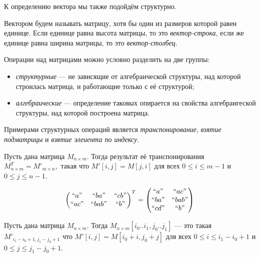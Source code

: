 К определению вектора мы также подойдём структурно.

\begin{definition}[Вектор]

Вектором будем называть матрицу, хотя бы один из размеров которой равен единице. Если единице равна высота матрицы, то это \textit{вектор-строка}, если же единице равна ширина матрицы, то это \textit{вектор-столбец}.

\end{definition}


Операции над матрицами можно условно разделить на две группы:
\begin{itemize}
	\item \textit{структурные} --- не зависящие от алгебраической структуры, над которой строилась матрица, и работающие только с её структурой;
	\item \textit{алгебраические} --- определение таковых опирается на свойства алгебраигеской структуры, над которой построена матрица.
\end{itemize}

Примерами структурных операций является \textit{транспонирование}, \textit{взятие подматрицы} и \textit{взятие элеиента по индексу}.

\begin{definition}
Пусть дана матрица $M_{n\times m}$. Тогда результат её транспонирования 
$
M_{n\times m}^T = M'_{m\times n},
$
такая что $M'[i,j] = M[j,i]$ для всех $0\leq i \leq m - 1$ и $0\leq j \leq n - 1$.
\end{definition}

\begin{example}
$$
\begin{pmatrix}
``a"  & ``ba"  & ``cb" \\
``ac" & ``bab" & ``b"  \\
\end{pmatrix}^T =
\begin{pmatrix}
``a"  & ``ac"  \\
``ba" & ``bab" \\
``cd" & ``b" \\
\end{pmatrix}
$$
\end{example}

\begin{definition}
Пусть дана матрица $M_{n\times m}$. Тогда 
$
M_{n\times m}[i_0..i_1,j_0..j_1]
$
 --- это такая $M'_{i_1 - i_0 + 1, j_1 - j_0 + 1}$ что $M'[i,j] = M[i_0 + i,j_0 + j]$ для всех $0\leq i \leq i_1 - i_0 + 1$ и $0\leq j \leq j_1 - j_0 + 1$.
\end{definition}


